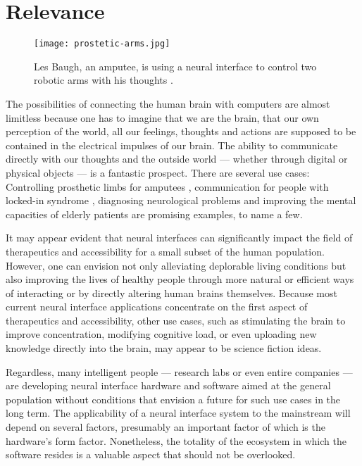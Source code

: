 
\section{Relevance}
\label{chapter1-relevance}

\begin{figure}
  \centering
  \texttt{[image: prostetic-arms.jpg]}
  \caption{Les Baugh, an amputee, is using a neural interface to control two robotic arms with his thoughts \citep{campbell_amputee_2014}.}
  \label{fig:prostetic-arms}
\end{figure}

The possibilities of connecting the human brain with computers are almost limitless because one has to imagine that we are the brain, that our own perception of the world, all our feelings, thoughts and actions are supposed to be contained in the electrical impulses of our brain. The ability to communicate directly with our thoughts and the outside world — whether through digital or physical objects — is a fantastic prospect. There are several use cases: Controlling prosthetic limbs for amputees \citep{murphy_electroencephalogram-based_2017}, communication for people with locked-in syndrome \citep{chaudhary_spelling_2022}, diagnosing neurological problems and improving the mental capacities of elderly patients \citep{belkacem_brain_2020} are promising examples, to name a few.

It may appear evident that neural interfaces can significantly impact the field of therapeutics and accessibility for a small subset of the human population. However, one can envision not only alleviating deplorable living conditions but also improving the lives of healthy people through more natural or efficient ways of interacting or by directly altering human brains themselves. Because most current neural interface applications concentrate on the first aspect of therapeutics and accessibility, other use cases, such as stimulating the brain to improve concentration, modifying cognitive load, or even uploading new knowledge directly into the brain, may appear to be science fiction ideas.

Regardless, many intelligent people — research labs or even entire companies — are developing neural interface hardware and software aimed at the general population without conditions that envision a future for such use cases in the long term. The applicability of a neural interface system to the mainstream will depend on several factors, presumably an important factor of which is the hardware's form factor. Nonetheless, the totality of the ecosystem in which the software resides is a valuable aspect that should not be overlooked.


